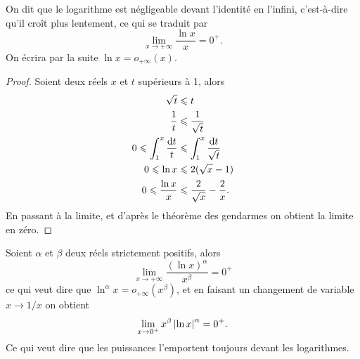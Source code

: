 \begin{theo}
  On dit que le logarithme est négligeable devant l'identité en
  l'infini, c'est-à-dire qu'il croît plus lentement, ce qui se traduit
  par
  \begin{equation}
    \lim\limits_{x \to+\infty}\frac{\ln{x}}{x}=0^+.
  \end{equation}
  On écrira par la suite \(\ln{x}=o_{+\infty}(x)\).
\end{theo}

\begin{proof}
  Soient deux réels \(x\) et \(t\) supérieurs à 1, alors
  \begin{align*}
    \sqrt{t} & \leqslant t \\
    \frac{1}{t} &\leqslant \frac{1}{\sqrt{t}}\\
    0 \leqslant \int_{1}^{x} \frac{\mathop{}\mathopen{}\mathrm{d} t}{t} &\leqslant
    \int_1^x\frac{\mathop{}\mathopen{}\mathrm{d} t}{\sqrt{t}}\\
    0 \leqslant \ln x &\leqslant 2(\sqrt{x}-1) \\
    0 \leqslant \frac{\ln x}{x} &\leqslant \frac{2}{\sqrt{x}} -
    \frac{2}{x}.
  \end{align*}
  En passant à la limite, et d'après le théorème des gendarmes on
  obtient la limite en zéro.
\end{proof}

\begin{prop}\label{prop-chap1:croissancecomparelnpuissance}
  Soient \(\alpha\) et \(\beta\) deux réels strictement positifs, alors
  \begin{equation}
    \lim\limits_{x \to+\infty}\frac{(\ln{x})^\alpha}{x^\beta}=0^+
  \end{equation}
  ce qui veut dire que \(\ln^{\alpha}x=o_{+\infty}(x^\beta)\), et en
  faisant un changement de variable \(x \to 1/x\) on obtient
  \begin{equation}
    \lim\limits_{x\to{}0^+}x^\beta\left\lvert\ln x\right\rvert^\alpha=0^+.
  \end{equation}
  Ce qui veut dire que les puissances \og{}l'emportent \fg{} toujours
  devant les logarithmes.
\end{prop}


